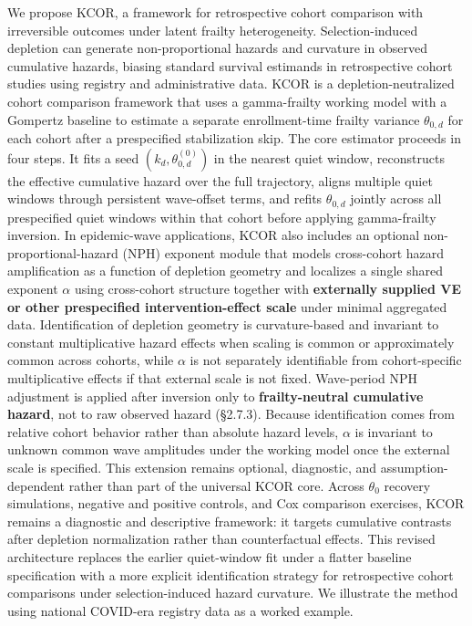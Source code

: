 \documentclass[
]{article}
\begin{document}
We propose KCOR, a framework for retrospective cohort comparison with
irreversible outcomes under latent frailty heterogeneity.
Selection-induced depletion can generate non-proportional hazards and
curvature in observed cumulative hazards, biasing standard survival
estimands in retrospective cohort studies using registry and
administrative data. KCOR is a depletion-neutralized cohort comparison
framework that uses a gamma-frailty working model with a Gompertz
baseline to estimate a separate enrollment-time frailty variance
\(\theta_{0,d}\) for each cohort after a prespecified stabilization
skip. The core estimator proceeds in four steps. It fits a seed
\((k_d,\theta_{0,d}^{(0)})\) in the nearest quiet window, reconstructs
the effective cumulative hazard over the full trajectory, aligns
multiple quiet windows through persistent wave-offset terms, and refits
\(\theta_{0,d}\) jointly across all prespecified quiet windows within
that cohort before applying gamma-frailty inversion. In epidemic-wave
applications, KCOR also includes an optional non-proportional-hazard
(NPH) exponent module that models cross-cohort hazard amplification as a
function of depletion geometry and localizes a single shared exponent
\(\alpha\) using cross-cohort structure together with \textbf{externally
supplied VE or other prespecified intervention-effect scale} under
minimal aggregated data. Identification of depletion geometry is
curvature-based and invariant to constant multiplicative hazard effects
when scaling is common or approximately common across cohorts, while
\(\alpha\) is not separately identifiable from cohort-specific
multiplicative effects if that external scale is not fixed. Wave-period
NPH adjustment is applied after inversion only to
\textbf{frailty-neutral cumulative hazard}, not to raw observed hazard
(§2.7.3). Because identification comes from relative cohort behavior
rather than absolute hazard levels, \(\alpha\) is invariant to unknown
common wave amplitudes under the working model once the external scale
is specified. This extension remains optional, diagnostic, and
assumption-dependent rather than part of the universal KCOR core. Across
\(\theta_0\) recovery simulations, negative and positive controls, and
Cox comparison exercises, KCOR remains a diagnostic and descriptive
framework: it targets cumulative contrasts after depletion normalization
rather than counterfactual effects. This revised architecture replaces
the earlier quiet-window fit under a flatter baseline specification with
a more explicit identification strategy for retrospective cohort
comparisons under selection-induced hazard curvature. We illustrate the
method using national COVID-era registry data as a worked example.
\end{document}
